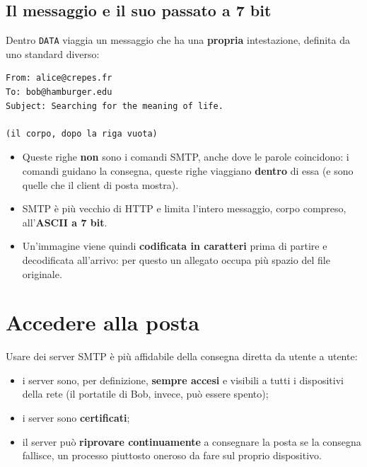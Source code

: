 \subsection{Il messaggio e il suo passato a 7 bit}

Dentro \texttt{DATA} viaggia un messaggio che ha una \textbf{propria} intestazione, definita da uno standard
diverso:

\begin{lstlisting}
From: alice@crepes.fr
To: bob@hamburger.edu
Subject: Searching for the meaning of life.

(il corpo, dopo la riga vuota)
\end{lstlisting}

\begin{itemize}
    \item Queste righe \textbf{non} sono i comandi SMTP, anche dove le parole coincidono: i comandi guidano la
          consegna, queste righe viaggiano \textbf{dentro} di essa (e sono quelle che il client di posta mostra).
    \item SMTP è più vecchio di HTTP e limita l'intero messaggio, corpo compreso, all'\textbf{ASCII a 7 bit}.
    \item Un'immagine viene quindi \textbf{codificata in caratteri} prima di partire e decodificata all'arrivo:
          per questo un allegato occupa più spazio del file originale.
\end{itemize}

\section{Accedere alla posta}

Usare dei server SMTP è più affidabile della consegna diretta da utente a utente:

\begin{itemize}
    \item i server sono, per definizione, \textbf{sempre accesi} e visibili a tutti i dispositivi della rete
          (il portatile di Bob, invece, può essere spento);
    \item i server sono \textbf{certificati};
    \item il server può \textbf{riprovare continuamente} a consegnare la posta se la consegna fallisce, un
          processo piuttosto oneroso da fare sul proprio dispositivo.
\end{itemize}


